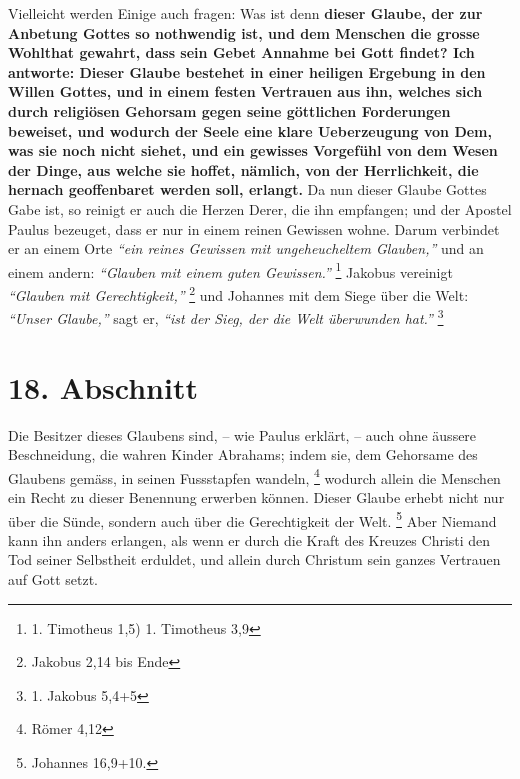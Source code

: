 Vielleicht werden Einige auch fragen: Was ist denn \textbf{dieser Glaube, der
zur
Anbetung Gottes so nothwendig ist, und dem Menschen die grosse Wohlthat gewahrt,
dass sein Gebet Annahme bei Gott findet? Ich antworte: Dieser Glaube bestehet in
einer heiligen Ergebung in den Willen Gottes, und in einem festen Vertrauen aus
ihn, welches sich durch religiösen Gehorsam gegen
seine göttlichen Forderungen
beweiset, und wodurch der Seele eine klare Ueberzeugung von Dem, was sie noch
nicht siehet, und ein gewisses Vorgefühl von dem Wesen der Dinge, aus welche sie
hoffet, nämlich, von der Herrlichkeit, die hernach geoffenbaret werden soll,
erlangt.} Da nun dieser Glaube Gottes Gabe ist, so reinigt er auch die Herzen
Derer, die ihn empfangen; und der Apostel Paulus bezeuget, dass er nur in einem
reinen Gewissen wohne. Darum verbindet er an einem Orte
\textit{"`ein reines Gewissen mit ungeheucheltem Glauben,"'} und an einem
andern: \textit{"`Glauben mit einem guten
Gewissen."'}
\footnote{1. Timotheus 1,5) 1. Timotheus 3,9}
Jakobus vereinigt
\textit{"`Glauben mit Gerechtigkeit,"'}
\footnote{Jakobus 2,14 bis Ende}
und Johannes mit dem Siege über
die Welt:\textit{ "`Unser Glaube,"'} sagt er, \textit{"`ist der Sieg, der die
Welt überwunden hat."'} 
\footnote{1. Jakobus 5,4+5}

\section{18. Abschnitt} \label{kap6_ab18}

Die Besitzer dieses Glaubens sind, -- wie Paulus erklärt, -- auch ohne äussere
Beschneidung, die wahren Kinder
Abrahams; indem sie, dem Gehorsame des Glaubens
gemäss, in seinen Fussstapfen wandeln,
\footnote{Römer 4,12}
wodurch allein die
Menschen ein Recht zu dieser Benennung erwerben können. Dieser Glaube erhebt
nicht nur über die Sünde, sondern auch über die
Gerechtigkeit der Welt.
\footnote{Johannes 16,9+10.}
Aber Niemand kann ihn anders erlangen, als wenn
er durch die Kraft des Kreuzes Christi den Tod seiner Selbstheit erduldet, und
allein durch Christum sein ganzes Vertrauen auf Gott setzt.

